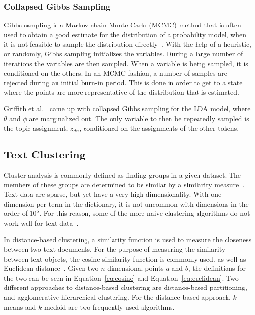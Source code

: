 \subsubsection{Collapsed Gibbs Sampling}

Gibbs sampling is a Markov chain Monte Carlo (MCMC) method that is often used to obtain a good estimate for the distribution of a probability model, when it is not feasible to sample the distribution directly~\cite{crain2012dimensionality}.
With the help of a heuristic, or randomly, Gibbs sampling initializes the variables.
During a large number of iterations the variables are then sampled.
When a variable is being sampled, it is conditioned on the others.
In an MCMC fashion, a number of samples are rejected during an initial burn-in period.
This is done in order to get to a state where the points are more representative of the distribution that is estimated.

Griffith et al\@.~\cite{griffiths2004finding} came up with collapsed Gibbs sampling for the LDA model, where $\theta$ and $\phi$ are marginalized out.
The only variable to then be repeatedly sampled is the topic assignment, $z_{dn}$, conditioned on the assignments of the other tokens.

\subsection{Text Clustering}

Cluster analysis is commonly defined as finding groups in a given dataset.
The members of these groups are determined to be similar by a similarity measure~\cite{kaufman2009finding, aggarwal2012survey}.
Text data are sparse, but yet have a very high dimensionality.
With one dimension per term in the dictionary, it is not uncommon with dimensions in the order of $10^5$.
For this reason, some of the more naive clustering algorithms do not work well for text data~\cite{aggarwal2012survey}.

In distance-based clustering, a similarity function is used to measure the closeness between two text documents.
For the purpose of measuring the similarity between text objects, the cosine similarity function is commonly used, as well as Euclidean distance~\cite{aggarwal2012survey}.
Given two $n$ dimensional points $a$ and $b$, the definitions for the two can be seen in Equation~\ref{eq:cosine} and Equation~\ref{eq:euclidean}.
Two different approaches to distance-based clustering are distance-based partitioning, and agglomerative hierarchical clustering.
For the distance-based approach, $k$-means and $k$-medoid are two frequently used algorithms.

